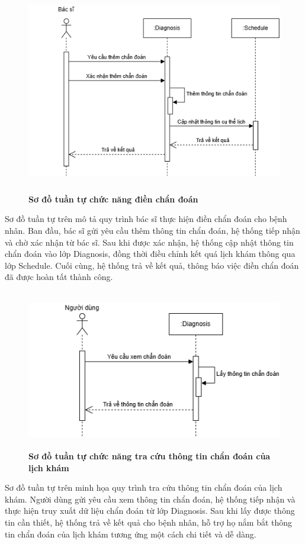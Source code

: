 \begin{figure}[H]
	\centering
	\includegraphics[width=11.5cm,height=9cm]{Images/sequence/diagnosis/create.drawio.png}
	\caption[Sơ đồ tuần tự chức năng điền chẩn đoán]{\bfseries \fontsize{12pt}{0pt}
		\selectfont Sơ đồ tuần tự chức năng điền chẩn đoán}
	\label{sequence_create_diag} %
\end{figure}
Sơ đồ tuần tự trên mô tả quy trình bác sĩ thực hiện điền chẩn đoán cho bệnh nhân. Ban đầu, bác sĩ gửi yêu cầu thêm thông tin chẩn đoán, hệ thống tiếp nhận và chờ xác nhận từ bác sĩ.
Sau khi được xác nhận, hệ thống cập nhật thông tin chẩn đoán vào lớp Diagnosis, đồng thời điều chỉnh kết quá lịch khám thông qua lớp Schedule.
Cuối cùng, hệ thống trả về kết quả, thông báo việc điền chẩn đoán đã được hoàn tất thành công.

\begin{figure}[H]
	\centering
	\includegraphics[width=11.5cm,height=7cm]{Images/sequence/diagnosis/getByScheduleId.drawio.png}
	\caption[Sơ đồ tuần tự chức năng tra cứu thông tin chẩn đoán của lịch khám]{\bfseries \fontsize{12pt}{0pt}
		\selectfont Sơ đồ tuần tự chức năng tra cứu thông tin chẩn đoán của lịch khám}
	\label{sequence_get} %
\end{figure}
Sơ đồ tuần tự trên minh họa quy trình tra cứu thông tin chẩn đoán của lịch khám. Người dùng gửi yêu cầu xem thông tin chẩn đoán, hệ thống tiếp nhận và thực hiện truy xuất dữ liệu chẩn đoán từ lớp Diagnosis.
Sau khi lấy được thông tin cần thiết, hệ thống trả về kết quả cho bệnh nhân, hỗ trợ họ nắm bắt thông tin chẩn đoán của lịch khám tương ứng một cách chi tiết và dễ dàng.

